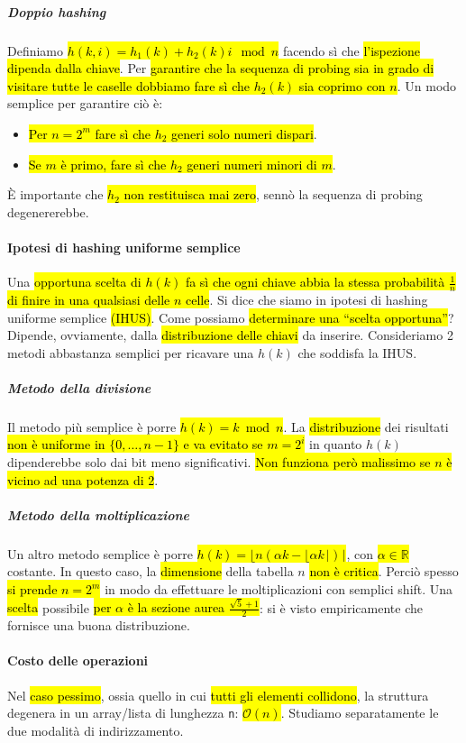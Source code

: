 \documentclass[a4paper,11pt,oneside]{article}
\theoremstyle{plain}
\theoremstyle{definition}
\theoremstyle{remark}
\begin{document}
\subparagraph{Doppio hashing} Definiamo \hl{$h(k,i) = h_1(k) + h_2 (k)i
\mod{n}$} facendo sì che \hl{l'ispezione dipenda dalla chiave}. Per
\hl{garantire che la sequenza di probing sia in grado di visitare tutte le
caselle dobbiamo fare sì che $h_2(k)$ sia coprimo con $n$}. Un modo semplice per
garantire ciò è:

\begin{itemize}
  \item \hl{Per $n = 2^m$ fare sì che $h_2$ generi solo numeri dispari}.
  \item \hl{Se $m$ è primo, fare sì che $h_2$ generi numeri minori di $m$}.
\end{itemize}

\noindent È importante che \hl{$h_2$ non restituisca mai zero}, sennò la
sequenza di probing degenererebbe.

\paragraph{Ipotesi di hashing uniforme semplice} Una \hl{opportuna scelta di
$h(k)$ fa sì che ogni chiave abbia la stessa probabilità $\frac{1}{n}$ di finire
in una qualsiasi delle $n$ celle}. Si dice che siamo in ipotesi di hashing
uniforme semplice \hl{(IHUS)}. Come possiamo \hl{determinare una ``scelta
opportuna''}? Dipende, ovviamente, dalla \hl{distribuzione delle chiavi} da
inserire. Consideriamo 2 metodi abbastanza semplici per ricavare una $h(k)$ che
soddisfa la IHUS.

\subparagraph{Metodo della divisione} Il metodo più semplice è porre \hl{$h(k) =
k \bmod n$}. La \hl{distribuzione} dei risultati \hl{non è uniforme in $\{0,
\ldots, n-1\}$ e va evitato se $m = 2^i$} in quanto $h(k)$ dipenderebbe solo dai
bit meno significativi. \hl{Non funziona però malissimo se $n$ è vicino ad una
potenza di 2}.

\subparagraph{Metodo della moltiplicazione} Un altro metodo semplice è porre
\hl{$h(k) = \lfloor n(\alpha k - \lfloor \alpha k \rfloor) \rfloor$}, con
\hl{$\alpha \in \mathbb{R}$} costante. In questo caso, la \hl{dimensione} della
tabella $n$ \hl{non è critica}. Perciò spesso \hl{si prende $n = 2^m$} in modo
da effettuare le moltiplicazioni con semplici shift. Una \hl{scelta} possibile
\hl{per $\alpha$ è la sezione aurea $\frac{\sqrt{5} + 1}{2}$}: si è visto
empiricamente che fornisce una buona distribuzione.

\paragraph{Costo delle operazioni} Nel \hl{caso pessimo}, ossia quello in cui
\hl{tutti gli elementi collidono}, la struttura degenera in un array/lista di
lunghezza \texttt{n}: \hl{$\mathcal{O}(n)$}. Studiamo separatamente le due
modalità di indirizzamento.
\end{document}
